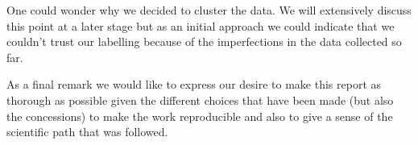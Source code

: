 One could wonder why we decided to cluster the data. We will extensively discuss this point at a later stage but as an initial approach we could indicate that we couldn't trust our labelling because of the imperfections in the data collected so far.

As a final remark we would like to express our desire to make this report as thorough as possible given the different choices that have been made (but also the concessions) to make the work reproducible and also to give a sense of the scientific path that was followed.
